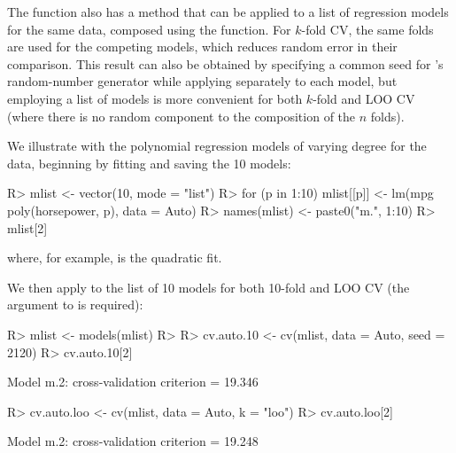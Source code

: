 \documentclass[
]{jss}
\begin{document}
The  function also has a method that can be applied to a list
of regression models for the same data, composed using the
 function. For \(k\)-fold CV, the same folds are used for
the competing models, which reduces random error in their comparison.
This result can also be obtained by specifying a common seed for
's random-number generator while applying 
separately to each model, but employing a list of models is more
convenient for both \(k\)-fold and LOO CV (where there is no random
component to the composition of the \(n\) folds).

We illustrate with the polynomial regression models of varying degree
for the  data, beginning by fitting and saving the 10 models:

\begin{CodeChunk}
\begin{CodeInput}
R> mlist <- vector(10, mode = "list")
R> for (p in 1:10) mlist[[p]] <- lm(mpg ~ poly(horsepower, p), data = Auto)
R> names(mlist) <- paste0("m.", 1:10)
R> mlist[2]
\end{CodeInput}
\end{CodeChunk}

where, for example,  is the quadratic fit.

We then apply  to the list of 10 models for both 10-fold and
LOO CV (the  argument to  is required):

\begin{CodeChunk}
\begin{CodeInput}
R> mlist <- models(mlist)
R>
R> cv.auto.10 <- cv(mlist, data = Auto, seed = 2120)
R> cv.auto.10[2]
\end{CodeInput}
\begin{CodeOutput}
Model m.2:
cross-validation criterion = 19.346
\end{CodeOutput}
\begin{CodeInput}
R> cv.auto.loo <- cv(mlist, data = Auto, k = "loo")
R> cv.auto.loo[2]
\end{CodeInput}
\begin{CodeOutput}
Model m.2:
cross-validation criterion = 19.248
\end{CodeOutput}
\end{CodeChunk}
\end{document}

